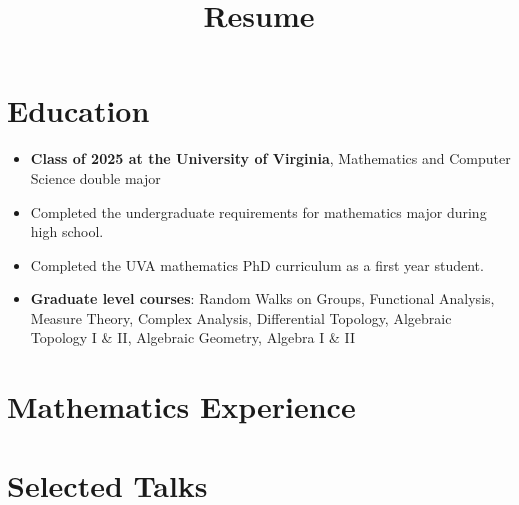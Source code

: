 \documentclass[11pt,letterpaper,sans]{moderncv}
\title{Resume}
\begin{document}
\makecvtitle %
\vspace*{-3.5em}


%

\section{Education}

\begin{itemize}
  \item \textbf{Class of 2025 at the University of Virginia}, Mathematics and Computer Science double major
  \item Completed the undergraduate requirements for mathematics major during high school.
  \item Completed the UVA mathematics PhD curriculum as a first year student.
  \item \textbf{Graduate level courses}: Random Walks on Groups, Functional Analysis, Measure Theory, Complex Analysis, Differential Topology, Algebraic Topology I \& II, Algebraic Geometry, Algebra I \& II
\end{itemize}



\section{Mathematics Experience}




\section{Selected Talks}
\end{document}
